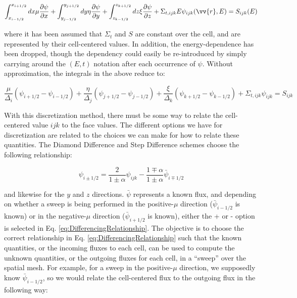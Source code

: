 \documentclass[10pt]{article}
\begin{document}
\begin{flushleft}
\begin{equation}
\int_{x_{i-1/2}}^{x_{i+1/2}}dx\mu \frac{\partial \psi}{\partial x}+\int_{y_{j-1/2}}^{y_{j+1/2}}dy\eta \frac{\partial \psi}{\partial y}+\int_{z_{k-1/2}}^{z_{k+1/2}}dz\xi \frac{\partial \psi}{\partial z}+\Sigma_{t,ijk}{E}\psi_{ijk}(\vv{r},E)=S_{ijk}(E)
\end{equation}

where it has been assumed that \(\Sigma_t\) and \(S\) are constant over the cell, and are represented by their cell-centered values. In addition, the energy-dependence has been dropped, though the dependency could easily be re-introduced by simply carrying around the \((E, t)\) notation after each occurrence of \(\psi\). Without approximation, the integrals in the above reduce to:

\begin{equation}
\label{eq:DiscretizedCartesianTE}
\frac{\mu}{\Delta_i}(\psi_{i+1/2}-\psi_{i-1/2})+\frac{\eta}{\Delta_j}(\psi_{j+1/2}-\psi_{j-1/2})+\frac{\xi}{\Delta_k}(\psi_{k+1/2}-\psi_{k-1/2})+\Sigma_{t,ijk}\psi_{ijk}=S_{ijk}
\end{equation}

With this discretization method, there must be some way to relate the cell-centered value \(ijk\) to the face values. The different options we have for discretization are related to the choices we can make for how to relate these quantities. The Diamond Difference and Step Difference schemes choose the following relationship:

\begin{equation}
\label{eq:DifferencingRelationship}
\psi_{i\pm1/2}=\frac{2}{1\pm\alpha}\psi_{ijk}-\frac{1\mp\alpha}{1\pm\alpha}\bar{\psi}_{i\mp1/2}
\end{equation}

and likewise for the \(y\) and \(z\) directions. \(\bar{\psi}\) represents a known flux, and depending on whether a sweep is being performed in the positive-\(\mu\) direction (\(\bar{\psi}_{i-1/2}\) is known) or in the negative-\(\mu\) direction (\(\bar{\psi}_{i+1/2}\) is known), either the + or - option is selected in Eq. \eqref{eq:DifferencingRelationship}. The objective is to choose the correct relationship in Eq. \eqref{eq:DifferencingRelationship} such that the known quantities, or the incoming fluxes to each cell, can be used to compute the unknown quantities, or the outgoing fluxes for each cell, in a ``sweep'' over the spatial mesh. For example, for a sweep in the positive-\(\mu\) direction, we supposedly know \(\bar{\psi}_{i-1/2}\), so we would relate the cell-centered flux to the outgoing flux in the following way:


\end{flushleft}
\end{document}
